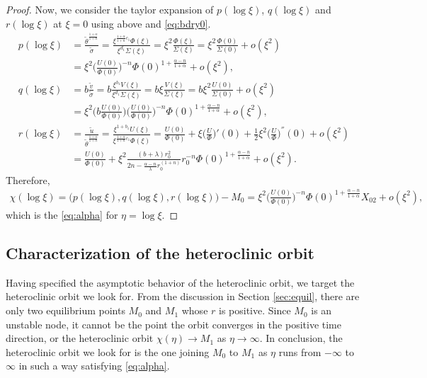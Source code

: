 \documentclass[a4paper,11pt]{article}
\def\tv{{\tilde{v}}}
\def\tth{{\tilde{\theta}}}
\def\ts{{\tilde{\sigma}}}
\def\tu{{\tilde{u}}}
\begin{document}
\begin{proof}
Now, we consider the taylor expansion of $p(\log\xi)$, $q(\log\xi)$ and $r(\log\xi)$ at $\xi=0$ using above and \eqref{eq:bdry0}.
\begin{align*}
 p(\log\xi) &= \frac{ \tth^{\frac{1+\alpha}{1+n}} }{\ts} = \frac{ \xi^{\frac{1+\alpha}{1+n}c_1} \Phi(\xi)}{\xi^{d_1} \Sigma(\xi)} = \xi^2\frac{\Phi(\xi)}{\Sigma(\xi)} = \xi^2\frac{\Phi(0)}{\Sigma(0)} + o(\xi^2) \\
 &= \xi^2\Big(\frac{U(0)}{\Phi(0)}\Big)^{-n}\Phi(0)^{1+\frac{\alpha-n}{1+\alpha}} + o(\xi^2),\\
 q(\log\xi) &= b\frac{\tv}{\ts} = b\frac{ \xi^{b_1} V(\xi) }{ \xi^{d_1} \Sigma(\xi)} = b\xi\frac{ V(\xi) }{ \Sigma(\xi)} = b\xi^2 \frac{U(0)}{\Sigma(0)}+ o(\xi^2) \\
 &= \xi^2\Big(b\frac{U(0)}{\Phi(0)}\Big)\Big(\frac{U(0)}{\Phi(0)}\Big)^{-n}\Phi(0)^{1+\frac{\alpha-n}{1+\alpha}} + o(\xi^2),\\
 r(\log\xi) &= \frac{\tu}{ \tth^{\frac{1+\alpha}{1+n}} } = \frac{ \xi^{1+b_1}U(\xi) }{ \xi^{\frac{1+\alpha}{1+n}c_1}\Phi(\xi) } = \frac{ U(0) }{ \Phi(0) }+ \xi \Big(\frac{U}{\Phi}\Big)'(0) + \frac{1}{2}\xi^2\Big(\frac{U}{\Phi}\Big)^{''}(0) + o(\xi^2)\\
  &=\frac{ U(0) }{ \Phi(0) } + \xi^2\frac{ (b+\lambda) r_0^{2} }{ 2n - \frac{\alpha-n}{\lambda}r_0^{(1+n)}} r_0^{-n} \Phi(0)^{1+\frac{\alpha-n}{1+\alpha}} + o(\xi^2).
\end{align*}
Therefore,
\begin{align*}
\chi(\log\xi) = \big(p(\log\xi),q(\log\xi),r(\log\xi)\big) -M_0 = \xi^2\Big(\frac{U(0)}{\Phi(0)}\Big)^{-n}\Phi(0)^{1+\frac{\alpha-n}{1+\alpha}} X_{02} + o(\xi^2),
\end{align*}
which is the \eqref{eq:alpha} for $\eta=\log\xi$.
\end{proof}

\subsection{Characterization of the heteroclinic orbit}
Having specified the asymptotic behavior of the heteroclinic orbit, we target the heteroclinic orbit we look for. From the discussion in Section \ref{sec:equil}, there are only two equilibrium points $M_0$ and $M_1$ whose $r$ is positive. Since $M_0$ is an unstable node, it cannot be the point the orbit converges in the positive time direction, or the heteroclinic orbit $\chi(\eta) \rightarrow M_1$ as $\eta \rightarrow \infty$. In conclusion, the heteroclinic orbit we look for is the one joining $M_0$ to $M_1$ as $\eta$ runs from $-\infty$ to $\infty$ in such a way satisfying \eqref{eq:alpha}. 
\end{document}
